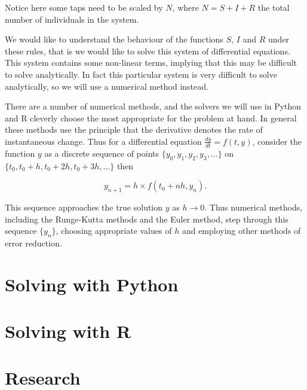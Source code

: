 Notice here some taps need to be scaled by $N$, where $N = S + I + R$ the total
number of individuals in the system.

We would like to understand the behaviour of the functions $S$, $I$ and $R$
under these rules, that is we would like to solve this system of differential
equations. This system contains some non-linear terms, implying that this may be
difficult to solve analytically. In fact this particular system is very
difficult to solve analytically, so we will use a numerical method instead.

There are a number of numerical methods, and the solvers we will use in Python
and R cleverly choose the most appropriate for the problem at hand. In general
these methods use the principle that the derivative denotes the rate of
instantaneous change. Thus for a differential equation $\frac{dy}{dt} = f(t,y)$,
consider the function $y$ as a discrete sequence of points
$\{y_0, y_1, y_2, y_3, \dots\}$ on $\{t_0, t_0 + h, t_0 + 2h, t_0 + 3h, \dots\}$
then

\begin{equation}
y_{n+1} = h \times f(t_0 + nh, y_n).
\end{equation}

This sequence approaches the true solution $y$ as $h \rightarrow 0$.
Thus numerical methods, including the Runge-Kutta methods and the Euler method,
step through this sequence $\{y_n\}$, choosing appropriate values of $h$ and
employing other methods of error reduction.


\section{Solving with Python}\label{sec:solving-with-python}



\section{Solving with R}\label{sec:solving-with-R}
\section{Research}\label{sec:research}
